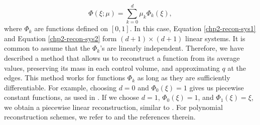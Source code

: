 \begin{equation*}
	\Phi(\xi;\mu) = \sum_{k=0}^d \mu_k \Phi_k(\xi),
\end{equation*}
where $\Phi_k$ are functions defined on $[0,1]$. In this case, Equation 
\eqref{chp2-recon-sys1} and Equation \eqref{chp2-recon-sys2} form $(d+1)\times (d+1)$ linear systems.
It is common to assume that the $\Phi_k$'s are linearly independent.
Therefore, we have described a method that allows us to reconstruct a 
function from its average values, preserving its mass in each control volume, 
and approximating $q$ at the edges. This method works for functions $\Phi_k$
as long as they are sufficiently differentiable.
For example, choosing $d=0$ and $\Phi_0(\xi)=1$ gives us piecewise constant
functions, as used in \citet{godunov:1959}.
If we choose $d=1$, $\Phi_0(\xi)=1$, and $\Phi_1(\xi)=\xi$, we 
obtain a piecewise linear reconstruction, similar to \citet{vanleer:1977}.
For polynomial reconstruction schemes, we refer to \citet{engwirda:2016} and the references therein.

